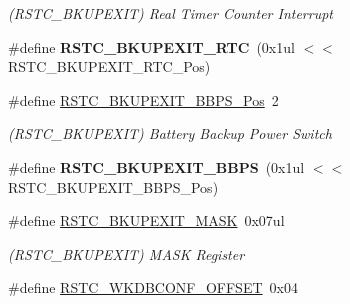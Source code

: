 \begin{DoxyCompactItemize}
\begin{DoxyCompactList}\small\item\em (R\+S\+T\+C\+\_\+\+B\+K\+U\+P\+E\+X\+I\+T) Real Timer Counter Interrupt \end{DoxyCompactList}\item 
\hypertarget{group___s_a_m_l21___r_s_t_c_ga98827211677a15f05866a45985c19eb1}{}\#define {\bfseries R\+S\+T\+C\+\_\+\+B\+K\+U\+P\+E\+X\+I\+T\+\_\+\+R\+T\+C}~(0x1ul $<$$<$ R\+S\+T\+C\+\_\+\+B\+K\+U\+P\+E\+X\+I\+T\+\_\+\+R\+T\+C\+\_\+\+Pos)\label{group___s_a_m_l21___r_s_t_c_ga98827211677a15f05866a45985c19eb1}

\item 
\hypertarget{group___s_a_m_l21___r_s_t_c_ga1461e50dc74bc7212220c39ad9c0cb77}{}\#define \hyperlink{group___s_a_m_l21___r_s_t_c_ga1461e50dc74bc7212220c39ad9c0cb77}{R\+S\+T\+C\+\_\+\+B\+K\+U\+P\+E\+X\+I\+T\+\_\+\+B\+B\+P\+S\+\_\+\+Pos}~2\label{group___s_a_m_l21___r_s_t_c_ga1461e50dc74bc7212220c39ad9c0cb77}

\begin{DoxyCompactList}\small\item\em (R\+S\+T\+C\+\_\+\+B\+K\+U\+P\+E\+X\+I\+T) Battery Backup Power Switch \end{DoxyCompactList}\item 
\hypertarget{group___s_a_m_l21___r_s_t_c_gade43dad9b75a83e14a43a9a4ec5f1516}{}\#define {\bfseries R\+S\+T\+C\+\_\+\+B\+K\+U\+P\+E\+X\+I\+T\+\_\+\+B\+B\+P\+S}~(0x1ul $<$$<$ R\+S\+T\+C\+\_\+\+B\+K\+U\+P\+E\+X\+I\+T\+\_\+\+B\+B\+P\+S\+\_\+\+Pos)\label{group___s_a_m_l21___r_s_t_c_gade43dad9b75a83e14a43a9a4ec5f1516}

\item 
\hypertarget{group___s_a_m_l21___r_s_t_c_ga31c970c537b7e41f52187f4f9b8bc883}{}\#define \hyperlink{group___s_a_m_l21___r_s_t_c_ga31c970c537b7e41f52187f4f9b8bc883}{R\+S\+T\+C\+\_\+\+B\+K\+U\+P\+E\+X\+I\+T\+\_\+\+M\+A\+S\+K}~0x07ul\label{group___s_a_m_l21___r_s_t_c_ga31c970c537b7e41f52187f4f9b8bc883}

\begin{DoxyCompactList}\small\item\em (R\+S\+T\+C\+\_\+\+B\+K\+U\+P\+E\+X\+I\+T) M\+A\+S\+K Register \end{DoxyCompactList}\item 
\hypertarget{group___s_a_m_l21___r_s_t_c_gaa480df9a3568537db8c4ac9bbaef95ba}{}\#define \hyperlink{group___s_a_m_l21___r_s_t_c_gaa480df9a3568537db8c4ac9bbaef95ba}{R\+S\+T\+C\+\_\+\+W\+K\+D\+B\+C\+O\+N\+F\+\_\+\+O\+F\+F\+S\+E\+T}~0x04\label{group___s_a_m_l21___r_s_t_c_gaa480df9a3568537db8c4ac9bbaef95ba}


\end{DoxyCompactItemize}
